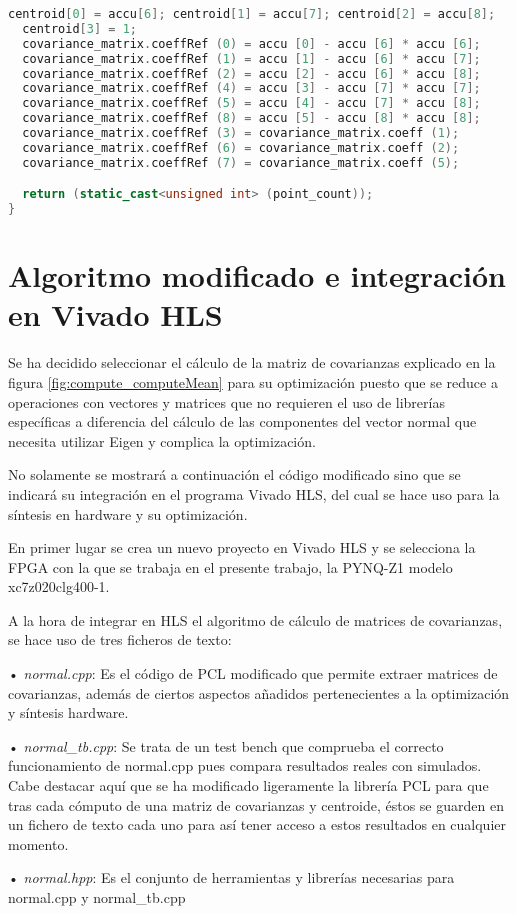  \begin{lstlisting}[language=C++,breaklines]
  centroid[0] = accu[6]; centroid[1] = accu[7]; centroid[2] = accu[8];
  centroid[3] = 1;
  covariance_matrix.coeffRef (0) = accu [0] - accu [6] * accu [6];
  covariance_matrix.coeffRef (1) = accu [1] - accu [6] * accu [7];
  covariance_matrix.coeffRef (2) = accu [2] - accu [6] * accu [8];
  covariance_matrix.coeffRef (4) = accu [3] - accu [7] * accu [7];
  covariance_matrix.coeffRef (5) = accu [4] - accu [7] * accu [8];
  covariance_matrix.coeffRef (8) = accu [5] - accu [8] * accu [8];
  covariance_matrix.coeffRef (3) = covariance_matrix.coeff (1);
  covariance_matrix.coeffRef (6) = covariance_matrix.coeff (2);
  covariance_matrix.coeffRef (7) = covariance_matrix.coeff (5);

  return (static_cast<unsigned int> (point_count));
}
\end{lstlisting}



\section{Algoritmo modificado e integración en Vivado HLS}
Se ha decidido seleccionar el cálculo de la matriz de covarianzas explicado en la figura \ref{fig:compute_computeMean} para su optimización puesto que se reduce a operaciones con vectores y matrices que no requieren el uso de librerías específicas a diferencia del cálculo de las componentes del vector normal que necesita utilizar Eigen y complica la optimización.

No solamente se mostrará a continuación el código modificado sino que se indicará su integración en el programa Vivado HLS, del cual se hace uso para la síntesis en hardware y su optimización.

En primer lugar se crea un nuevo proyecto en Vivado HLS y se selecciona la FPGA con la que se trabaja en el presente trabajo, la PYNQ-Z1 modelo xc7z020clg400-1.

A la hora de integrar en HLS el algoritmo de cálculo de matrices de covarianzas, se hace uso de tres ficheros de texto:

\begin{list}{•}
\item[•] \textit{normal.cpp}: Es el código de PCL modificado que permite extraer matrices de covarianzas, además de ciertos aspectos añadidos pertenecientes a la optimización y síntesis hardware.
\item[•] \textit{normal\_tb.cpp}: Se trata de un test bench que comprueba el correcto funcionamiento de normal.cpp pues compara resultados reales con simulados. Cabe destacar aquí que se ha modificado ligeramente la librería PCL para que tras cada cómputo de una matriz de covarianzas y centroide, éstos se guarden en un fichero de texto cada uno para así tener acceso a estos resultados en cualquier momento.
\item[•] \textit{normal.hpp}: Es el conjunto de herramientas y librerías necesarias para normal.cpp y normal\_tb.cpp
\end{list}

